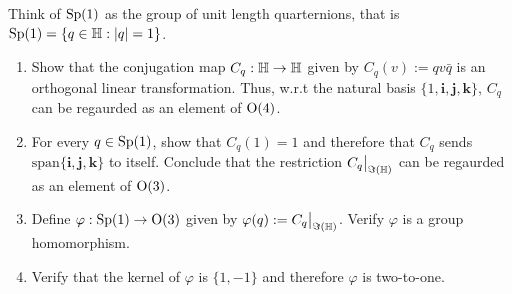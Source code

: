 \documentclass[12pt]{book}
\theoremstyle{definition}
\begin{document}
\begin{taggedexercise}[Complete]
  Think of $\mathrm{Sp}(1)$ as the group of unit length quarternions, that is $\mathrm{Sp}(1) = \{ q \in \mathbb{H} : |q| = 1 \}$.
  \begin{enumerate}
    \item Show that the conjugation map $C_q : \mathbb{H} \to \mathbb{H}$ given by $C_q(v) := q v \bar{q}$ is an orthogonal linear transformation. Thus, w.r.t the natural basis $\{1, \mathbf{i}, \mathbf{j}, \mathbf{k}\}$, $C_q$ can be regaurded as an element of $\mathrm{O}(4)$.
    \item For every $q \in \mathrm{Sp}(1)$, show that $C_q(1) = 1$ and therefore that $C_q$ sends $\text{span}\{\mathbf{i}, \mathbf{j}, \mathbf{k}\}$ to itself. Conclude that the restriction $C_q \big|_{\Im(\mathbb{H})}$ can be regaurded as an element of $\mathrm{O}(3)$.
    \item Define $\varphi : \mathrm{Sp}(1) \to \mathrm{O}(3)$ given by $\varphi(q) := C_q \big|_{\Im(\mathbb{H})}$. Verify $\varphi$ is a group homomorphism.
    \item Verify that the kernel of $\varphi$ is $\{1, -1\}$ and therefore $\varphi$ is two-to-one.
  \end{enumerate}
\end{taggedexercise}
\end{document}
